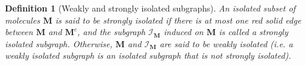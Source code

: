 \documentclass{article}
\newcommand{\1}{\mathds{1}}
\numberwithin{equation}{section}
\renewcommand{\cal}{\mathcal}
\renewcommand{\geq}{\geqslant}
\renewcommand{\ge}{\geq}
\theoremstyle{plain} %
\newtheorem{definition}[theorem]{Definition}
\theoremstyle{remark}
\newcommand{\Pol}{{\mathbf{M}}}
\newcommand{\Iso}{{\mathcal I}}
\begin{document}
\begin{definition}[Weakly and strongly isolated subgraphs]\label{def_weakstrong}
An isolated subset of molecules $\Pol$ is said to be \emph{strongly isolated} if there is \emph{at most one} red solid edge between $\Pol$ and $\Pol^c$, and the subgraph $\Iso_\Pol$ induced on $\Pol$ is called a strongly isolated subgraph. %
Otherwise, $\Pol$ and $\Iso_\Pol$ are said to be weakly isolated (i.e. a weakly isolated subgraph is an isolated subgraph that is not 
strongly isolated). 



\end{definition}

%
\end{document}

